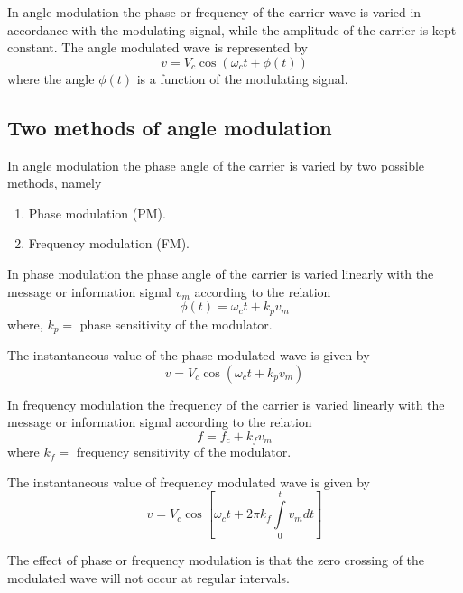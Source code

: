 In angle modulation the phase or frequency of the carrier wave is varied in accordance with the modulating signal, while the amplitude of the carrier is kept constant. The angle modulated wave is represented by
\begin{equation}
v=V_{c}\cos (\omega_{c}t+\phi(t))\label{eq9.47}
\end{equation}
where the angle $\phi(t)$ is a function of the modulating signal.

\subsection{Two methods of angle modulation}\label{sec9.17.1}

In angle modulation the phase angle of the carrier is varied by two possible methods, namely
\begin{enumerate}
\item Phase modulation (PM).

\item Frequency modulation (FM).
\end{enumerate}

In phase modulation the phase angle of the carrier is varied linearly with the message or information signal $v_{m}$ according to the relation
\begin{equation}
\phi(t)=\omega_{c}t+k_{p}v_{m}\label{eq9.48}
\end{equation}
where, $k_{p}=$ phase sensitivity of the modulator.

The instantaneous value of the phase modulated wave is given by
\begin{equation}
v=V_{c}\cos (\omega_{c}t+k_{p}v_{m})\label{eq9.49}
\end{equation}

In frequency modulation the frequency of the carrier is varied linearly with the message or information signal according to the relation
\begin{equation}
f=f_{c}+k_{f}v_{m}\label{eq9.50}
\end{equation}
where $k_{f}=$ frequency sensitivity of the modulator.

The instantaneous value of frequency modulated wave is given by
\begin{equation}
v=V_{c}\cos \left[\omega_{c}t+2\pi k_{f}\int\limits^{t}_{0}v_{m}dt\right]\label{eq9.51}
\end{equation}

The effect of phase or frequency modulation is that the zero crossing of the modulated wave will not occur at regular intervals.


